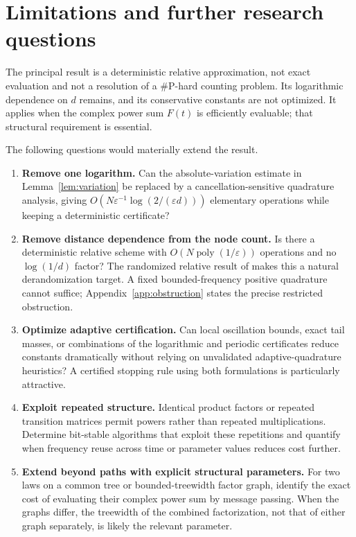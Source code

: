\documentclass[11pt]{article}
\theoremstyle{definition}
\theoremstyle{remark}
\newcommand{\eps}{\varepsilon}
\newcommand{\poly}{\operatorname{poly}}
\begin{document}
\section{Limitations and further research questions}
\label{sec:future}

The principal result is a deterministic relative approximation, not exact evaluation and not a resolution of a \#P-hard counting problem. Its logarithmic dependence on $d$ remains, and its conservative constants are not optimized. It applies when the complex power sum $F(t)$ is efficiently evaluable; that structural requirement is essential.

The following questions would materially extend the result.
\begin{enumerate}[label=\textbf{\arabic*.},leftmargin=*]
\item \textbf{Remove one logarithm.} Can the absolute-variation estimate in Lemma~\ref{lem:variation} be replaced by a cancellation-sensitive quadrature analysis, giving $O(N\eps^{-1}\log(2/(\eps d)))$ elementary operations while keeping a deterministic certificate?

\item \textbf{Remove distance dependence from the node count.} Is there a deterministic relative scheme with $O(N\poly(1/\eps))$ operations and no $\log(1/d)$ factor? The randomized relative result of \cite{ABG26} makes this a natural derandomization target. A fixed bounded-frequency positive quadrature cannot suffice; Appendix~\ref{app:obstruction} states the precise restricted obstruction.

\item \textbf{Optimize adaptive certification.} Can local oscillation bounds, exact tail masses, or combinations of the logarithmic and periodic certificates reduce constants dramatically without relying on unvalidated adaptive-quadrature heuristics? A certified stopping rule using both formulations is particularly attractive.

\item \textbf{Exploit repeated structure.} Identical product factors or repeated transition matrices permit powers rather than repeated multiplications. Determine bit-stable algorithms that exploit these repetitions and quantify when frequency reuse across time or parameter values reduces cost further.

\item \textbf{Extend beyond paths with explicit structural parameters.} For two laws on a common tree or bounded-treewidth factor graph, identify the exact cost of evaluating their complex power sum by message passing. When the graphs differ, the treewidth of the combined factorization, not that of either graph separately, is likely the relevant parameter.


\end{enumerate}
\end{document}
